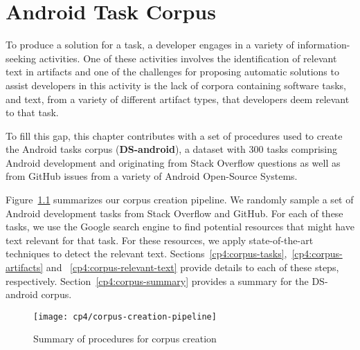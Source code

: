 \setcounter{chapter}{3}
\setcounter{rq}{1}


\chapter{Android Task Corpus}
\label{ch:android-corpus}




To produce a solution for a task, a developer engages in a variety of
information-seeking activities.  One of these activities involves
the identification of relevant text in artifacts
and one of the challenges for proposing automatic solutions to 
assist developers in this activity
is
the lack of corpora containing
software tasks, 
and text, from a variety of different artifact types, that developers deem
relevant to that task.




To fill this gap, 
this chapter contributes with 
a set of procedures used to create
the Android tasks corpus (\textbf{\acs{DS-android}}), a dataset with 300 tasks comprising Android development and originating from Stack Overflow questions
as well as from GitHub issues from a variety of Android Open-Source Systems.




Figure~\ref{fig:corpus-creation-pipeline}
summarizes our corpus creation pipeline.
We randomly sample a set of Android development tasks from Stack Overflow and GitHub.
For each of these tasks, we use the Google search engine to find potential resources that might have
text relevant for that task. For these resources, we apply state-of-the-art techniques to detect the relevant text.
Sections~\ref{cp4:corpus-tasks},~\ref{cp4:corpus-artifacts} and ~\ref{cp4:corpus-relevant-text}
provide details to each of these steps, respectively.
Section~\ref{cp4:corpus-summary} provides a summary for the \acs{DS-android} corpus.


\begin{figure}
    \centering
    \texttt{[image: cp4/corpus-creation-pipeline]}
    \caption{Summary of procedures for corpus creation}
    \label{fig:corpus-creation-pipeline}
\end{figure}

\clearpage
















